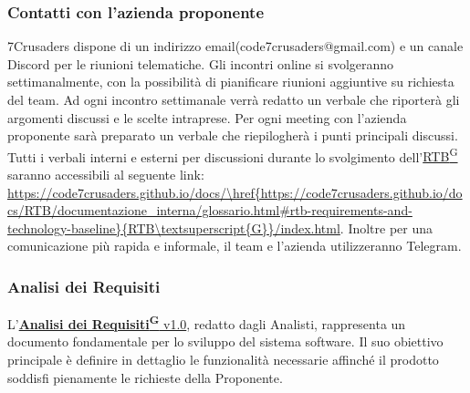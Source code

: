 \subsubsection{Contatti con l’azienda proponente}
7Crusaders dispone di un indirizzo email(code7crusaders@gmail.com) e un canale Discord per le riunioni telematiche. 
Gli incontri online si svolgeranno settimanalmente, con la possibilità di pianificare riunioni aggiuntive su richiesta del team.
Ad ogni incontro settimanale verrà redatto un verbale che riporterà gli argomenti discussi e le scelte intraprese.
Per ogni meeting con l’azienda proponente sarà preparato un verbale che riepilogherà i punti principali discussi. 
Tutti i verbali interni e esterni per discussioni durante lo svolgimento dell'\href{https://code7crusaders.github.io/docs/RTB/documentazione_interna/glossario.html#rtb-requirements-and-technology-baseline}{RTB\textsuperscript{G}} saranno accessibili al seguente link: \url{https://code7crusaders.github.io/docs/\href{https://code7crusaders.github.io/docs/RTB/documentazione_interna/glossario.html#rtb-requirements-and-technology-baseline}{RTB\textsuperscript{G}}/index.html}.
Inoltre per una comunicazione più rapida e informale, il team e l'azienda utilizzeranno Telegram.

\subsubsection{Analisi dei Requisiti}

L'\href{https://code7crusaders.github.io/docs/RTB/documentazione_interna/glossario.html#analisi-dei-requisiti}{\textbf{Analisi dei Requisiti\textsuperscript{G}} v1.0}, redatto dagli Analisti, rappresenta un documento fondamentale per lo sviluppo del sistema software. Il suo obiettivo principale è definire in dettaglio le funzionalità necessarie affinché il prodotto soddisfi pienamente le richieste della Proponente.

